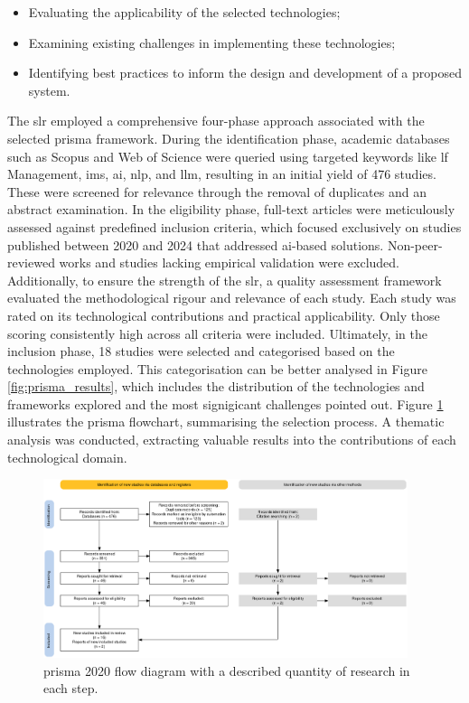 \begin{itemize}
\item Evaluating the applicability of the selected technologies;
\item Examining existing challenges in implementing these technologies;
\item Identifying best practices to inform the design and development of a proposed system.
\end{itemize}

The \ac{slr} employed a comprehensive four-phase approach associated with the selected \ac{prisma} framework. During the identification phase, academic databases such as Scopus and Web of Science were queried using targeted keywords like \ac{lf} Management, \ac{ims}, \ac{ai}, \ac{nlp}, and \ac{llm}, resulting in an initial yield of 476 studies. These were screened for relevance through the removal of duplicates and an abstract examination. In the eligibility phase, full-text articles were meticulously assessed against predefined inclusion criteria, which focused exclusively on studies published between 2020 and 2024 that addressed \ac{ai}-based solutions. Non-peer-reviewed works and studies lacking empirical validation were excluded. Additionally, to ensure the strength of the \ac{slr}, a quality assessment framework evaluated the methodological rigour and relevance of each study. Each study was rated on its technological contributions and practical applicability. Only those scoring consistently high across all criteria were included. Ultimately, in the inclusion phase, 18 studies were selected and categorised based on the technologies employed. This categorisation can be better analysed in Figure \ref{fig:prisma_results}, which includes the distribution of the technologies and frameworks explored and the most signigicant challenges pointed out. Figure \ref{fig:prisma_workflow} illustrates the \ac{prisma} flowchart, summarising the selection process. A thematic analysis was conducted, extracting valuable results into the contributions of each technological domain.

\begin{figure}[!htb]
    \includegraphics[width=0.95\textwidth]{figs/chapter2/prisma.png}
    \centering
    \caption[\acs{prisma} 2020 flow diagram with a described quantity of research in each step.]{\acs{prisma} 2020 flow diagram with a described quantity of research in each step.}
    \label{fig:prisma_workflow}
\end{figure}

